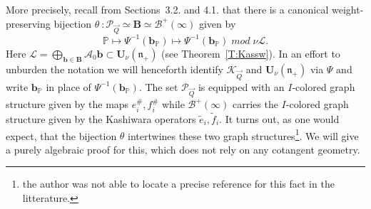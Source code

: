 \documentclass[a4paper,10pt]{amsart}
\def\U{\mathbf{U}}
\def\n{\mathfrak{n}}
\numberwithin{equation}{section}
\begin{document}
\vspace{.1in}

More precisely, recall from Sections~3.2. and 4.1. that there is a canonical weight-preserving bijection $\theta~: \mathcal{P}_{\vec{Q}} \simeq \mathbf{B} \simeq \mathcal{B}^+(\infty)$ given by
$$\mathbb{P} \mapsto \Psi^{-1}(\mathbf{b}_{\mathbb{P}}) \mapsto  \Psi^{-1}(\mathbf{b}_{\mathbb{P}}) \;mod\; \nu \mathcal{L}.$$
Here $\mathcal{L}=\bigoplus_{\mathbf{b} \in \mathbf{B}}  \mathcal{A}_0 \mathbf{b} \subset \U_{\nu}(\n_+)$ (see Theorem~\ref{T:Kassw}). In an effort to unburden the notation we will henceforth identify $\mathcal{K}_{\vec{Q}}$ and $\U_{\nu}(\n_+)$ via $\Psi$ and write $\mathbf{b}_{\mathbb{P}}$ in place of $\Psi^{-1}(\mathbf{b}_{\mathbb{P}})$. The set $\mathcal{P}_{\vec{Q}}$ is equipped with an $I$-colored graph structure given by the maps $e_i^\#, f_i^\#$ while $\mathcal{B}^+(\infty)$ carries the $I$-colored graph structure given by the Kashiwara operators $\tilde{e}_i, \tilde{f}_i$. It turns out, as one would expect, that the bijection $\theta$ intertwines these two graph structures\footnote{the author was not able to locate a precise reference for this fact in the litterature.}. We will give a purely algebraic proof for this, which does not rely on any cotangent geometry. 

\vspace{.1in}
\end{document}
